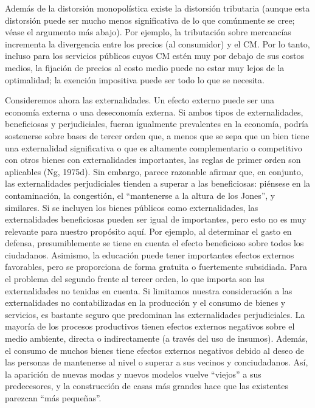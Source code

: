 \documentclass[10pt,a4paper]{article}
\begin{document}
Además de la distorsión monopolística existe la distorsión tributaria (aunque esta distorsión puede ser mucho menos significativa de lo que comúnmente se cree; véase el argumento más abajo). Por ejemplo, la tributación sobre mercancías incrementa la divergencia entre los precios (al consumidor) y el CM. Por lo tanto, incluso para los servicios públicos cuyos CM estén muy por debajo de sus costos medios, la fijación de precios al costo medio puede no estar muy lejos de la optimalidad; la exención impositiva puede ser todo lo que se necesita.

Consideremos ahora las externalidades. Un efecto externo puede ser una economía externa o una deseconomía externa. Si ambos tipos de externalidades, beneficiosas y perjudiciales, fueran igualmente prevalentes en la economía, podría sostenerse sobre bases de tercer orden que, a menos que se sepa que un bien tiene una externalidad significativa o que es altamente complementario o competitivo con otros bienes con externalidades importantes, las reglas de primer orden son aplicables (Ng, 1975d). Sin embargo, parece razonable afirmar que, en conjunto, las externalidades perjudiciales tienden a superar a las beneficiosas: piénsese en la contaminación, la congestión, el “mantenerse a la altura de los Jones”, y similares. Si se incluyen los bienes públicos como externalidades, las externalidades beneficiosas pueden ser igual de importantes, pero esto no es muy relevante para nuestro propósito aquí. Por ejemplo, al determinar el gasto en defensa, presumiblemente se tiene en cuenta el efecto beneficioso sobre todos los ciudadanos. Asimismo, la educación puede tener importantes efectos externos favorables, pero se proporciona de forma gratuita o fuertemente subsidiada. Para el problema del segundo frente al tercer orden, lo que importa son las externalidades no tenidas en cuenta. Si limitamos nuestra consideración a las externalidades no contabilizadas en la producción y el consumo de bienes y servicios, es bastante seguro que predominan las externalidades perjudiciales. La mayoría de los procesos productivos tienen efectos externos negativos sobre el medio ambiente, directa o indirectamente (a través del uso de insumos). Además, el consumo de muchos bienes tiene efectos externos negativos debido al deseo de las personas de mantenerse al nivel o superar a sus vecinos y conciudadanos. Así, la aparición de nuevas modas y nuevos modelos vuelve “viejos” a sus predecesores, y la construcción de casas más grandes hace que las existentes parezcan “más pequeñas”.
\end{document}
